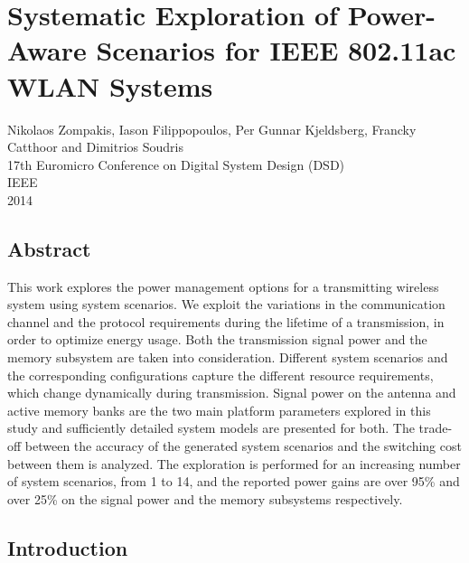 \chapter{Systematic Exploration of Power-Aware Scenarios for IEEE 802.11ac WLAN Systems}
\label{dsd}

\begin{center}
Nikolaos Zompakis, Iason Filippopoulos, Per Gunnar Kjeldsberg, Francky Catthoor and Dimitrios Soudris
\\
17th Euromicro Conference on Digital System Design (DSD) 
\\
IEEE
\\
2014
\end{center}
\afterpage{\null\newpage}
\newpage

\vspace*{\fill}
\section*{\hspace*{\fill} Abstract \hspace*{\fill}}
This work explores the power management options for a transmitting wireless system using system scenarios. We exploit the variations in the communication channel and the protocol requirements during the lifetime of a transmission, in order to optimize energy usage. Both the transmission signal power and the memory subsystem are taken into consideration. Different system scenarios and the corresponding configurations capture the different resource requirements, which change dynamically during transmission. Signal power on the antenna and active memory banks are the two main platform parameters explored in this study and sufficiently detailed system models are presented for both. The trade-off between the accuracy of the generated system scenarios and the switching cost between them is analyzed. The exploration is performed for an increasing number of system scenarios, from 1 to 14, and the reported power gains are over 95\% and over 25\% on the signal power and the memory subsystems respectively.
\vspace*{\fill}
\afterpage{\null\newpage}
\newpage

\section{Introduction}

